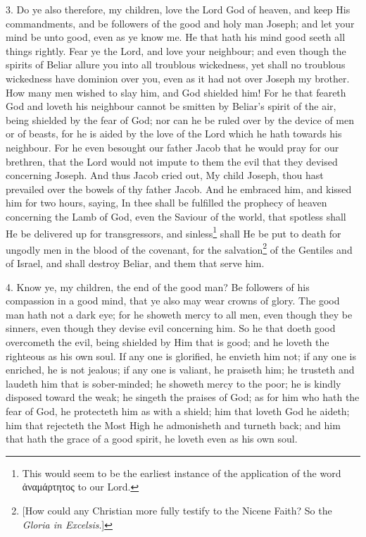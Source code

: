 3. Do ye also therefore, my children, love the Lord God of heaven, and keep His commandments, and be followers of the good and holy man Joseph; and let your mind be unto good, even as ye know me. He that hath his mind good seeth all things rightly. Fear ye the Lord, and love your neighbour; and even though the spirits of Beliar allure you into all troublous wickedness, yet shall no troublous wickedness have dominion over you, even as it had not over Joseph my brother. How many men wished to slay him, and God shielded him! For he that feareth God and loveth his neighbour cannot be smitten by Beliar’s spirit of the air, being shielded by the fear of God; nor can he be ruled over by the device of men or of beasts, for he is aided by the love of the Lord which he hath towards his neighbour. For he even besought our father Jacob that he would pray for our brethren, that the Lord would not impute to them the evil that they devised concerning Joseph. And thus Jacob cried out, My child Joseph, thou hast prevailed over the bowels of thy father Jacob. And he embraced him, and kissed him for two hours, saying, In thee shall be fulfilled the prophecy of heaven concerning the Lamb of God, even the Saviour of the world, that spotless shall He be delivered up for transgressors, and sinless\footnote{This would seem to be the earliest instance of the application of the word \textgreek{ἀναμάρτητος} to our Lord.} shall He be put to death for ungodly men in the blood of the covenant, for the salvation\footnote{[How could any Christian more fully testify to the Nicene Faith? So the \emph{Gloria in Excelsis}.]} of the Gentiles and of Israel, and shall destroy Beliar, and them that serve him.

4. Know ye, my children, the end of the good man? Be followers of his compassion in a good mind, that ye also may wear crowns of glory. The good man hath not a dark eye; for he showeth mercy to all men, even though they be sinners, even though they devise evil concerning him. So he that doeth good overcometh the evil, being shielded by Him that is good; and he loveth the righteous as his own soul. If any one is glorified, he envieth him not; if any one is enriched, he is not jealous; if any one is valiant, he praiseth him; he trusteth and laudeth him that is sober-minded; he showeth mercy to the poor; he is kindly disposed toward the weak; he singeth the praises of God; as for him who hath the fear of God, he protecteth him as with a shield; him that loveth God he aideth; him that rejecteth the Most High he admonisheth and turneth back; and him that hath the grace of a good spirit, he loveth even as his own soul.

